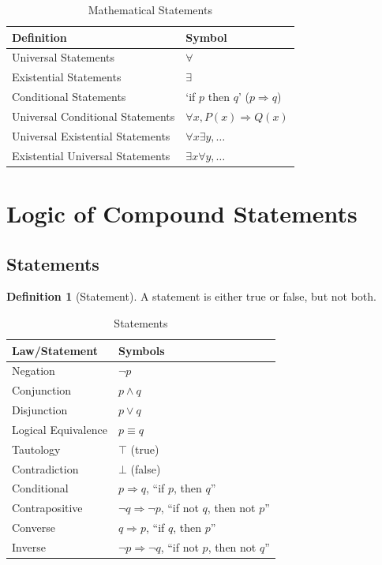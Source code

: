 \documentclass{article}
\theoremstyle{plain}
\theoremstyle{definition}
\newtheorem*{definition}{Definition}
\theoremstyle{remark}
\begin{document}
\begin{table}[H]
    \centering
    \begin{tabular}{ll}
        \toprule
        \textbf{Definition} & \textbf{Symbol} \\
        \midrule
        Universal Statements & $\forall$ \\
        Existential Statements & $\exists$ \\
        Conditional Statements & `if $p$ then $q$' ($p \Rightarrow q$) \\
        Universal Conditional Statements & $\forall x, P(x) \Rightarrow Q(x)$ \\
        Universal Existential Statements & $\forall x \exists y, \dots$ \\
        Existential Universal Statements & $\exists x \forall y, \dots$ \\
        \bottomrule
    \end{tabular}
    \caption{Mathematical Statements}
    \label{tab:statements}
\end{table}

\newpage

\section{Logic of Compound Statements}

\subsection{Statements}

\begin{definition}[Statement]
A statement is either true or false, but not both.
\end{definition}

\begin{table}[H]
    \centering
    \begin{tabular}{ll} 
        \toprule
        \textbf{Law/Statement} & \textbf{Symbols} \\ 
        \midrule 
        Negation & $\neg p$ \\ 
        Conjunction & $p \wedge q$ \\ 
        Disjunction & $p \vee q$ \\ 
        Logical Equivalence & $p \equiv q$ \\ 
        Tautology & $\top$ (true) \\ 
        Contradiction & $\bot$ (false) \\ 
        Conditional & $p \Rightarrow q$, ``if $p$, then $q$'' \\ 
        Contrapositive & $\neg q \Rightarrow \neg p$, ``if not $q$, then not $p$'' \\ 
        Converse & $q \Rightarrow p$, ``if $q$, then $p$'' \\ 
        Inverse & $\neg p \Rightarrow \neg q$, ``if not $p$, then not $q$'' \\ 
        \bottomrule
    \end{tabular}
    \caption{Statements}
    \label{tab:statement}
\end{table}
\end{document}
